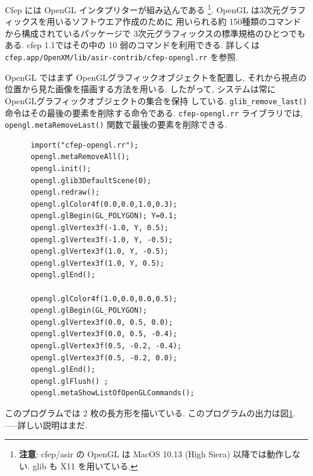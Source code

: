 \documentclass{jbook}
\begin{document}
Cfep には OpenGL インタプリターが組み込んである
\footnote{{\bf 注意}: cfep/asir の
OpenGL は MacOS 10.13 (High Siera) 以降では動作しない.
glib も X11 を用いている.}.
OpenGL は3次元グラフィックスを用いるソフトウエア作成のために
用いられる約 150種類のコマンドから構成されているパッケージで
3次元グラフィックスの標準規格のひとつでもある.
cfep 1.1ではその中の 10 弱のコマンドを利用できる.
詳しくは
{\tt cfep.app/OpenXM/lib/asir-contrib/cfep-opengl.rr} を参照.

OpenGL ではまず OpenGLグラフィックオブジェクトを配置し,
それから視点の位置から見た画像を描画する方法を用いる.
したがって, システムは常に OpenGLグラフィックオブジェクトの集合を保持
している.
{\tt glib\_remove\_last()} 命令はその最後の要素を削除する命令である.
{\tt cfep-opengl.rr} ライブラリでは,
{\tt opengl.metaRemoveLast()} 関数で最後の要素を削除できる.

\begin{figure}[tb]
\caption{} \label{fig:twoPolygon}
\end{figure}

\begin{screen}
\begin{verbatim}
      import("cfep-opengl.rr");
      opengl.metaRemoveAll();
      opengl.init();      
      opengl.glib3DefaultScene(0);
      opengl.redraw(); 
      opengl.glColor4f(0.0,0.0,1.0,0.3);  
      opengl.glBegin(GL_POLYGON); Y=0.1;
      opengl.glVertex3f(-1.0, Y, 0.5);
      opengl.glVertex3f(-1.0, Y, -0.5);
      opengl.glVertex3f(1.0, Y, -0.5);
      opengl.glVertex3f(1.0, Y, 0.5);
      opengl.glEnd();

      opengl.glColor4f(1.0,0.0,0.0,0.5); 
      opengl.glBegin(GL_POLYGON);
      opengl.glVertex3f(0.0, 0.5, 0.0);
      opengl.glVertex3f(0.0, 0.5, -0.4);
      opengl.glVertex3f(0.5, -0.2, -0.4);
      opengl.glVertex3f(0.5, -0.2, 0.0);
      opengl.glEnd();
      opengl.glFlush() ; 
      opengl.metaShowListOfOpenGLCommands();
\end{verbatim}
\end{screen}
このプログラムでは 2 枚の長方形を描いている.
このプログラムの出力は図\ref{fig:twoPolygon}.
-----詳しい説明はまだ.
\end{document}
